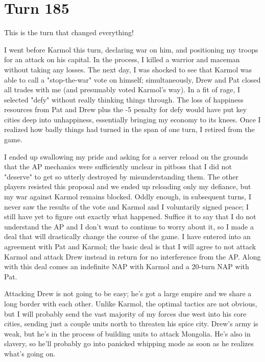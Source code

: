 \documentclass[10pt]{article}
\begin{document}
\section*{Turn 185}

This is the turn that changed everything!

I went before Karmol this turn, declaring war on him, and positioning
my troops for an attack on his capital. In the process, I killed a
warrior and maceman without taking any losses. The next day, I was
shocked to see that Karmol was able to call a "stop-the-war" vote on
himself; simultaneously, Drew and Pat closed all trades with me (and
presumably voted Karmol's way). In a fit of rage, I selected "defy"
without really thinking things through. The loss of happiness
resources from Pat and Drew plus the -5 penalty for defy would have
put key cities deep into unhappiness, essentially bringing my economy
to its knees. Once I realized how badly things had turned in the span
of one turn, I retired from the game.

I ended up swallowing my pride and asking for a server reload on the
grounds that the AP mechanics were sufficiently unclear in pitboss
that I did not "deserve" to get so utterly destroyed by
misunderstanding them. The other players resisted this proposal and we
ended up reloading only my defiance, but my war against Karmol remains
blocked. Oddly enough, in subsequent turns, I never saw the results of
the vote and Karmol and I voluntarily signed peace; I still have yet
to figure out exactly what happened. Suffice it to say that I do not
understand the AP and I don't want to continue to worry about it, so I
made a deal that will drastically change the course of the game. I
have entered into an agreement with Pat and Karmol; the basic deal is
that I will agree to not attack Karmol and attack Drew instead in
return for no interference from the AP. Along with this deal comes an
indefinite NAP with Karmol and a 20-turn NAP with Pat.

Attacking Drew is not going to be easy; he's got a large empire and we
share a long border with each other. Unlike Karmol, the optimal
tactics are not obvious, but I will probably send the vast majority of
my forces due west into his core cities, sending just a couple units
north to threaten his spice city. Drew's army is weak, but he's in the
process of building units to attack Mongolia. He's also in slavery, so
he'll probably go into panicked whipping mode as soon as he realizes
what's going on.
\end{document}
